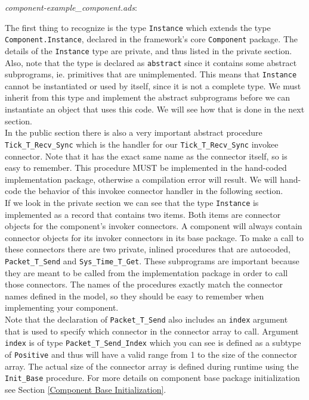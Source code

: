 \textit{component-example\_component.ads}:

The first thing to recognize is the type \texttt{Instance} which extends the type \texttt{Component.Instance}, declared in the framework's core \texttt{Component} package. The details of the \texttt{Instance} type are private, and thus listed in the private section. Also, note that the type is declared as \texttt{abstract} since it contains some abstract subprograms, ie. primitives that are unimplemented. This means that \texttt{Instance} cannot be instantiated or used by itself, since it is not a complete type. We must inherit from this type and implement the abstract subprograms before we can instantiate an object that uses this code. We will see how that is done in the next section. \\

In the public section there is also a very important abstract procedure \texttt{Tick\_T\_Recv\_Sync} which is the handler for our \texttt{Tick\_T\_Recv\_Sync} invokee connector. Note that it has the exact same name as the connector itself, so is easy to remember. This procedure MUST be implemented in the hand-coded implementation package, otherwise a compilation error will result. We will hand-code the behavior of this invokee connector handler in the following section. \\

If we look in the private section we can see that the type \texttt{Instance} is implemented as a record that contains two items. Both items are connector objects for the component's invoker connectors. A component will always contain connector objects for its invoker connectors in its base package. To make a call to these connectors there are two private, inlined procedures that are autocoded, \texttt{Packet\_T\_Send} and \texttt{Sys\_Time\_T\_Get}. These subprograms are important because they are meant to be called from the implementation package in order to call those connectors. The names of the procedures exactly match the connector names defined in the model, so they should be easy to remember when implementing your component. \\

Note that the declaration of \texttt{Packet\_T\_Send} also includes an \texttt{index} argument that is used to specify which connector in the connector array to call. Argument \texttt{index} is of type \texttt{Packet\_T\_Send\_Index} which you can see is defined as a subtype of \texttt{Positive} and thus will have a valid range from 1 to the size of the connector array. The actual size of the connector array is defined during runtime using the \texttt{Init\_Base} procedure. For more details on component base package initialization see Section \ref{Component Base Initialization}. \\

